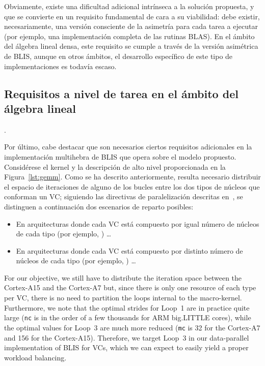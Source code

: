 Obviamente, existe una dificultad adicional intrínseca a la solución propuesta, y que se convierte en un requisito fundamental de cara
a su viabilidad: debe existir, necesariamente, una versión consciente de la asimetría para cada tarea a ejecutar (por ejemplo, una implementación
completa de las rutinas BLAS). En el ámbito del álgebra lineal densa, este requisito se cumple a través de la versión asimétrica de BLIS, aunque
en otros ámbitos, el desarrollo específico de este tipo de implementaciones es todavía escaso.

\subsection{Requisitos a nivel de tarea en el ámbito del álgebra lineal}

.

Por último, cabe destacar que son necesarios ciertos requisitos adicionales en la implementación multihebra de BLIS
que opera sobre el modelo propuesto. Considérese el kernel \gemm y la descripción de alto nivel proporcionada en la Figura~\ref{lst:gemm}. 
Como se ha descrito anteriormente, resulta necesario distribuir el espacio de iteraciones de alguno de los bucles entre los dos tipos de núcleos
que conforman un VC; siguiendo las directivas de paralelización descritas en~\cite{BLIS3}, se distinguen a continuación dos escenarios de reparto posibles:

\begin{itemize}
	\item En arquitecturas donde cada VC está compuesto por igual número de núcleos de cada tipo (por ejemplo, \odroid) \ldots

	\item En arquitecturas donde cada VC está compuesto por distinto número de núcleos de cada tipo (por ejemplo, \juno) \ldots

\end{itemize}

For our objective, we still have to distribute the iteration space between the Cortex-A15 and the Cortex-A7 but, since there is only one resource of each type per VC,
there is no need to partition the loops internal to the macro-kernel. 
Furthermore, we note that the optimal strides for Loop~1 are in practice quite
large ({\tt nc} is in the order of a few thousands for ARM big.LITTLE cores), while the optimal values for Loop~3 are much more reduced
({\tt mc} is 32 for the Cortex-A7 and 156 for the Cortex-A15). Therefore, we target Loop~3 in our data-parallel implementation of BLIS for
VCs, which we can expect to easily yield a proper workload balancing.

